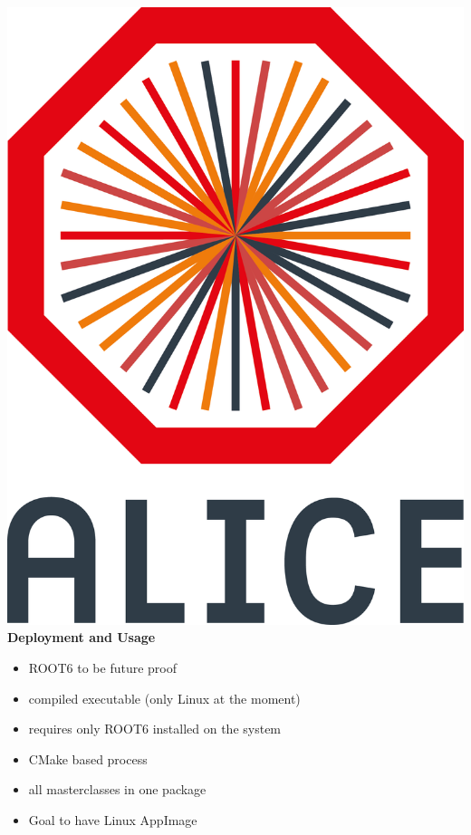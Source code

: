 \documentclass[aspectratio=169,14pt,dvipsnames]{beamer}
\begin{document}
\begin{frame}{\includegraphics[height=0.07\textheight]{2012-Jul-04-4_Color_Logo_CB.png} \hspace{0.2cm}\textbf{Deployment and Usage}}
  \begin{itemize}
    \item<1-> ROOT6 to be future proof
    \item<2-> compiled executable (only Linux at the moment)
    \item<2-> requires only ROOT6 installed on the system
    \item<2-> CMake based process
    \item<3-> all masterclasses in one package
    \item<3-> Goal to have Linux AppImage
  \end{itemize}
\end{frame}
\end{document}

